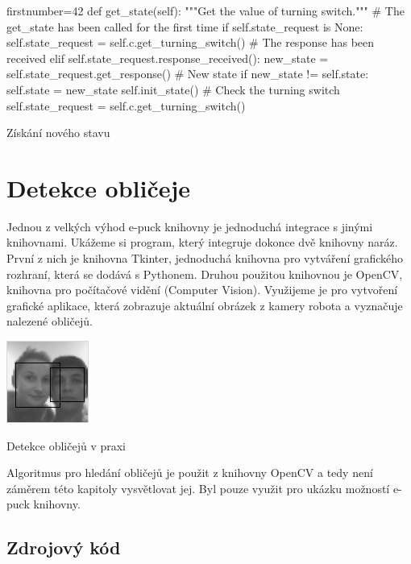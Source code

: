 \documentclass[12pt,notitlepage]{report}
\begin{document}
\begin{listing}[H]
\begin{pyc*}{firstnumber=42}
    def get_state(self):
        """Get the value of turning switch."""
        # The get_state has been called for the first time
        if self.state_request is None:
            self.state_request = self.c.get_turning_switch()
        # The response has been received
        elif self.state_request.response_received():
            new_state = self.state_request.get_response()
            # New state
            if new_state != self.state:
                self.state = new_state
                self.init_state()
            # Check the turning switch
            self.state_request = self.c.get_turning_switch()
\end{pyc*}
\caption{Získání nového stavu}
\label{get_state}
\end{listing}

\section{Detekce obličeje}
\label{face detection}

Jednou z velkých výhod e-puck knihovny je jednoduchá integrace s jinými
knihovnami. Ukážeme si program, který integruje dokonce dvě knihovny naráz.
První z nich je knihovna Tkinter, jednoduchá knihovna pro vytváření grafického
rozhraní, která se dodává s Pythonem. Druhou použitou knihovnou je OpenCV,
knihovna pro počítačové vidění (Computer Vision). Využijeme je pro vytvoření
grafické aplikace, která zobrazuje aktuální obrázek z kamery robota a vyznačuje
nalezené obličejů.

\begin{listing}[H]
\begin{center}
    \includegraphics{opencv.png}
    \caption{Detekce obličejů v praxi}
\end{center}
\end{listing}

Algoritmus pro hledání obličejů je použit z knihovny OpenCV a tedy není záměrem
této kapitoly vysvětlovat jej. Byl pouze využit pro ukázku možností e-puck
knihovny.

\subsection{Zdrojový kód}
\end{document}
